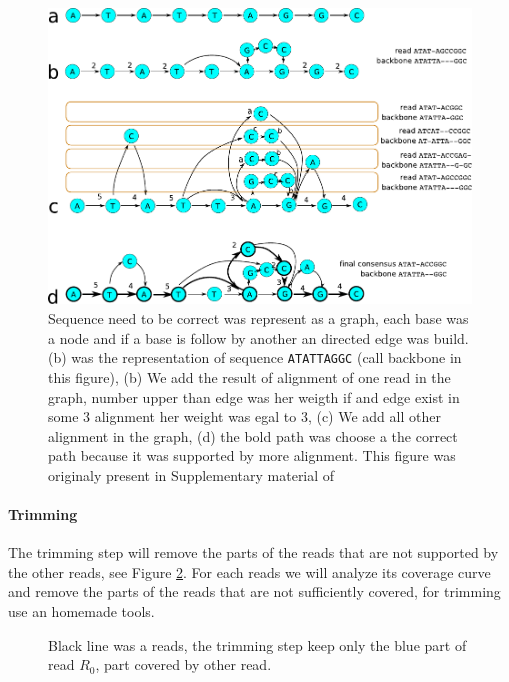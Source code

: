 \documentclass[main]{subfiles}
\begin{document}
\begin{figure}[ht]
    \centering
    \includegraphics[width=\textwidth]{state_of_the_art/images/POA_explain.pdf}
    \caption{Sequence need to be correct was represent as a graph, each base was a node and if a base is follow by another an directed edge was build. (b) was the representation of sequence \texttt{ATATTAGGC} (call backbone in this figure), (b) We add the result of alignment of one read in the graph, number upper than edge was her weigth if and edge exist in some 3 alignment her weight was egal to 3, (c) We add all other alignment in the graph, (d) the bold path was choose a the correct path because it was supported by more alignment. This figure was originaly present in Supplementary material of \hgap \cite{hgap}}
    \label{sota:fig:canu:correction}
\end{figure}

\paragraph{Trimming}

The trimming step will remove the parts of the reads that are not supported by the other reads, see Figure \ref{sota:fig:canu:trimming}. For each reads we will analyze its coverage curve and remove the parts of the reads that are not sufficiently covered, for trimming \canu use an homemade tools.

\begin{figure}[ht]
    \centering
    
    \caption{Black line was a reads, the \canu trimming step keep only the blue part of read $R_0$, part covered by other read.}
    \label{sota:fig:canu:trimming}
\end{figure}
\end{document}
